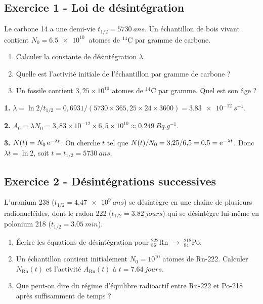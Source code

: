 \documentclass[12pt,a4paper]{article}
\begin{document}
\subsection*{Exercice 1 - Loi de désintégration \niveau{\facile}}

\begin{boiteexercice}
Le carbone 14 a une demi-vie $t_{1/2} = \qty{5730}{ans}$. Un échantillon de bois vivant contient $N_0 = \qty{6.5e10}{}$ atomes de ${}^{14}$C par gramme de carbone.
\begin{enumerate}
  \item Calculer la constante de désintégration $\lambda$.
  \item Quelle est l'activité initiale de l'échantillon par gramme de carbone ?
  \item Un fossile contient $3{,}25\times10^{10}$ atomes de ${}^{14}$C par gramme. Quel est son âge ?
\end{enumerate}
\end{boiteexercice}

\begin{boitecorrige}
\textbf{1.} $\lambda = \ln2/t_{1/2} = 0{,}6931/(5730\times365{,}25\times24\times3600) = \qty{3.83e-12}{s^{-1}}$.

\textbf{2.} $A_0 = \lambda N_0 = 3{,}83\times10^{-12}\times6{,}5\times10^{10} \approx \qty{0.249}{Bq.g^{-1}}$.

\textbf{3.} $N(t) = N_0\,\mathrm{e}^{-\lambda t}$. On cherche $t$ tel que $N(t)/N_0 = 3{,}25/6{,}5 = 0{,}5 = \mathrm{e}^{-\lambda t}$. Donc $\lambda t = \ln 2$, soit $t = t_{1/2} = \qty{5730}{ans}$.
\end{boitecorrige}

\subsection*{Exercice 2 - Désintégrations successives \niveau{\moyen}}

\begin{boiteexercice}
L'uranium 238 ($t_{1/2} = \qty{4.47e9}{ans}$) se désintègre en une chaîne de plusieurs radionucléides, dont le radon 222 ($t_{1/2} = \qty{3.82}{jours}$) qui se désintègre lui-même en polonium 218 ($t_{1/2} = \qty{3.05}{min}$).

\begin{enumerate}
  \item Écrire les équations de désintégration pour ${}^{222}_{86}$Rn $\to$ ${}^{218}_{84}$Po.
  \item Un échantillon contient initialement $N_0 = 10^{10}$ atomes de Rn-222. Calculer $N_{\text{Rn}}(t)$ et l'activité $A_{\text{Rn}}(t)$ à $t = \qty{7.64}{jours}$.
  \item Que peut-on dire du régime d'équilibre radioactif entre Rn-222 et Po-218 après suffisamment de temps ?
\end{enumerate}
\end{boiteexercice}
\end{document}
